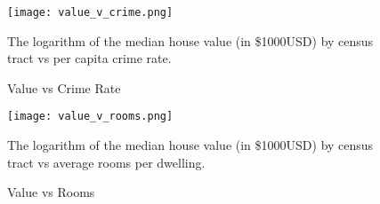 \documentclass[11pt]{article}
\begin{document}
\begin{figure}[h!] 
  \texttt{[image: value\_v\_crime.png]}
  \caption{Value vs Crime Rate}
  \medskip
	\small
	The logarithm of the median house value (in \$1000USD) by census tract vs per capita crime rate.
  \label{fig:crime}
\end{figure}


\begin{figure}[h!] 
  \texttt{[image: value\_v\_rooms.png]}
  \caption{Value vs Rooms}
  \medskip
	\small
	The logarithm of the median house value (in \$1000USD) by census tract vs average rooms per dwelling.
  \label{fig:rooms}
\end{figure}
\newpage 










\end{document}
